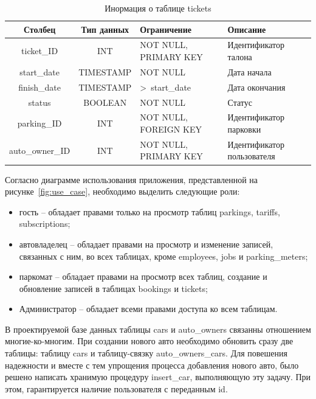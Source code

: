 \begin{table}[H]
	\begin{center}
		\begin{center}
			\caption{\label{tab:tickets}Инормация о таблице tickets}
		\end{center}
		\begin{tabular}{|c|c|p{3cm}|p{4cm}|}
			\hline 
			Столбец & Тип данных & Ограничение & Описание \\ \hline
			ticket\_ID & INT & NOT NULL, PRIMARY KEY & Идентификатор талона \\ \hline
	        start\_date & TIMESTAMP  & NOT NULL & Дата начала  \\ \hline
	        finish\_date &  TIMESTAMP & >~start\_date & Дата окончания  \\ \hline
	        status & BOOLEAN & NOT NULL & Статус \\ \hline
	        parking\_ID & INT & NOT NULL, FOREIGN KEY & Идентификатор парковки \\ \hline
	        auto\_owner\_ID & INT & NOT NULL, PRIMARY KEY & Идентификатор пользователя \\ \hline
		\end{tabular}
	\end{center}
\end{table}

Согласно диаграмме использования приложения, представленной на рисунке~\ref{fig:use_case}, необходимо выделить следующие роли:
\begin{itemize}
	\item гость -- обладает правами только на просмотр таблиц parkings, tariffs, subscriptions;
	\item автовладелец -- обладает правами на просмотр и изменение записей, связанных с ним, во всех таблицах, кроме employees, jobs и parking\_meters;
	\item паркомат -- обладает правами на просмотр всех таблиц, создание и обновление записей в таблицах bookings и tickets;
	\item Администратор -- обладает всеми правами доступа ко всем таблицам.
\end{itemize}

В проектируемой базе данных таблицы cars и auto\_owners связанны отношением многие-ко-многим. 
При создании нового авто необходимо обновить сразу две таблицы: таблицу cars и таблицу-связку auto\_owners\_cars. 
Для повешения надежности и вместе с тем упрощения процесса добавления нового авто, было решено написать хранимую процедуру insert\_car, выполняющую эту задачу. При этом, гарантируется наличие пользователя с переданным id.

